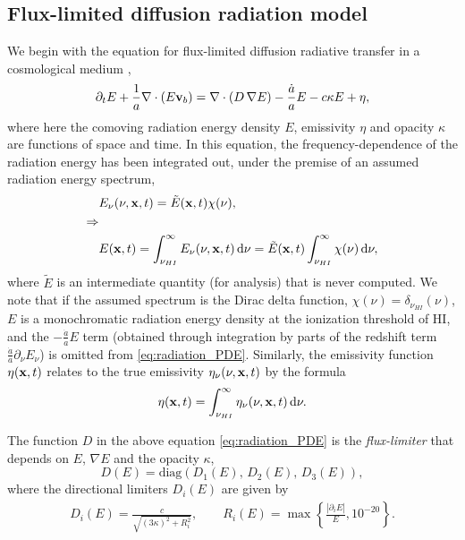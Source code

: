 \documentclass[letterpaper,10pt]{article}
\renewcommand{\(}{\left(}
\renewcommand{\)}{\right)}
\newcommand{\vb}{{\bf v}_b}
\newcommand{\xvec}{{\bf x}}
\begin{document}
\subsection{Flux-limited diffusion radiation model}
\label{sec:rad_model}

We begin with the equation for flux-limited diffusion radiative
transfer in a cosmological medium \cite{ReynoldsHayesPaschosNorman2009},
\begin{equation}
\label{eq:radiation_PDE}
  \partial_{t} E + \frac1a \nabla\cdot\(E\vb\) =
    \nabla\cdot\(D\,\nabla E\) - \frac{\dot{a}}{a} E - c\kappa E + \eta,
\end{equation}
where here the comoving radiation energy density $E$, emissivity
$\eta$ and opacity $\kappa$ are functions of space and time.  In this
equation, the frequency-dependence of the radiation energy has been
integrated out, under the premise of an assumed radiation energy
spectrum, 
\begin{align}
  \notag
  & E_{\nu}(\nu,\xvec,t) = \tilde{E}(\xvec,t) \chi(\nu), \\
  \notag
  \Rightarrow & \\
  \label{eq:spectrum}
  & E(\xvec,t) = \int_{\nu_{HI}}^{\infty} E_{\nu}(\nu,\xvec,t)\,\mathrm{d}\nu 
    = \tilde{E}(\xvec,t) \int_{\nu_{HI}}^{\infty} \chi(\nu)\,\mathrm{d}\nu,
\end{align}
where $\tilde{E}$ is an intermediate quantity (for analysis) that is
never computed.  We note that if the assumed spectrum is the Dirac
delta function, $\chi(\nu) = \delta_{\nu_{HI}}(\nu)$, $E$ is a
monochromatic radiation energy density at the ionization threshold of
HI, and the $-\frac{\dot{a}}{a}E$ term (obtained through integration
by parts of the redshift term
$\frac{\dot{a}}{a}\partial_{\nu}E_{\nu}$) is omitted from
\eqref{eq:radiation_PDE}. Similarly, the emissivity function
$\eta(\xvec,t)$ relates to the true emissivity 
$\eta_{\nu}(\nu,\xvec,t)$ by the formula
\begin{equation}
\label{eq:emissivity}
  \eta(\xvec,t) = \int_{\nu_{HI}}^{\infty}\eta_{\nu}(\nu,\xvec,t)\,\mathrm{d}\nu.
\end{equation}

The function $D$ in the above equation \eqref{eq:radiation_PDE} is
the {\em flux-limiter} that depends on $E$, $\nabla E$ and the 
opacity $\kappa$,  
\[
   D(E) = \text{diag}\( D_1(E),\, D_2(E),\, D_3(E) \),
\]
where the directional limiters $D_i(E)$ are given by \cite{Morel2000}
\begin{align}
  \label{eq:Larsen_limiter}
   D_i(E) = \frac{c}{\sqrt{(3\kappa)^2 + R_i^2}}, \qquad
   R_i(E) = \max\left\{\frac{|\partial_i E|}{E}, 10^{-20} \right\}.
\end{align}
\end{document}
